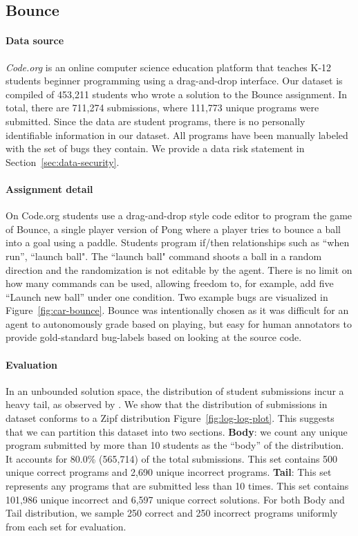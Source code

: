\documentclass{article}
\newcommand{\EDIT}[1]{#1}%
\newcommand{\PIECH}[1]{#1}%
\begin{document}
\subsection{Bounce}
\label{sec:bounce-exp}
\vspace{-2mm} 



\paragraph{Data source}
\textit{Code.org} is an online computer science education platform that teaches \EDIT{K-12 students} beginner programming \EDIT{using} a drag-and-drop interface.
Our dataset is compiled \EDIT{of} 453,211 students \EDIT{who wrote a solution to the Bounce assignment.} In total, there are 711,274 submissions, where 111,773 unique programs were submitted. Since the data are student programs, there is no personally identifiable information in our dataset. \EDIT{All programs have been manually labeled with the set of bugs they contain.} \EDIT{We provide a data risk statement in Section~\ref{sec:data-security}.} 

\paragraph{Assignment detail} On Code.org students use a drag-and-drop style code editor to program the game of \EDIT{Bounce, a single player version of Pong where a player tries to bounce a ball into a goal using a paddle.}  
\EDIT{Students program if/then relationships such as ``when run'', ``launch ball". The ``launch ball" command shoots a ball in a random direction and the randomization is not editable by the agent.} %
There is no limit on how many commands can be used, allowing freedom to, for example, add five ``Launch new ball'' under one condition.  Two example bugs are visualized in Figure~\ref{fig:car-bounce}. \PIECH{Bounce was intentionally chosen as it was difficult for an agent to autonomously grade based on playing, but easy for human annotators to provide gold-standard bug-labels based on looking at the source code.}


\paragraph{Evaluation}
In an unbounded solution space, the distribution of student submissions incur a heavy tail, as observed by \cite{wu2019zero}. We show that the distribution of submissions in dataset conforms to a Zipf distribution Figure~\ref{fig:log-log-plot}. This suggests that we can partition this dataset into two sections.
\textbf{Body}: we count any unique program submitted by more than 10 students as the ``body'' of the distribution. It accounts for 80.0\% (565,714) of the total submissions. This set contains 500 unique correct programs and 2,690 unique incorrect programs. 
\textbf{Tail}: This set represents any programs that are submitted less than 10 times. This set contains 101,986 unique incorrect and 6,597 unique correct solutions.
For both Body and Tail distribution, we sample 250 correct and 250 incorrect programs uniformly from each set for evaluation.
\end{document}
